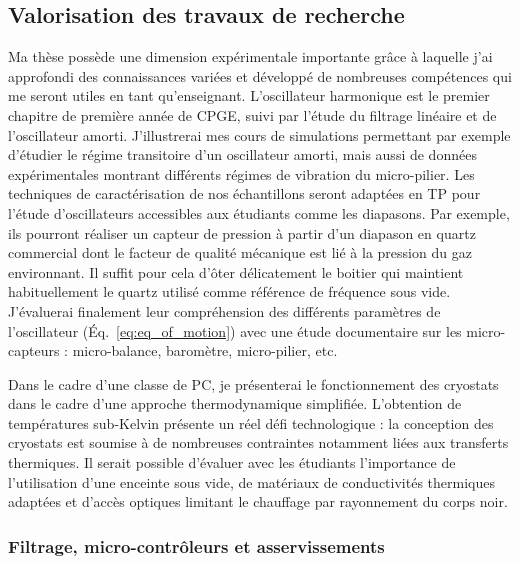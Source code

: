 \documentclass[12pt,a4paper]{article}
\begin{document}
\subsection{Valorisation des travaux de recherche}

Ma thèse possède une dimension expérimentale importante grâce à laquelle j'ai approfondi des connaissances variées et développé de nombreuses compétences qui me seront utiles en tant qu'enseignant.
L'oscillateur harmonique est le premier chapitre de première année de CPGE, suivi par l'étude du filtrage linéaire et de l'oscillateur amorti.
J'illustrerai mes cours de simulations permettant par exemple d'étudier le régime transitoire d'un oscillateur amorti, mais aussi de données expérimentales montrant différents régimes de vibration du micro-pilier.
Les techniques de caractérisation de nos échantillons seront adaptées en TP pour l'étude d'oscillateurs accessibles aux étudiants comme les diapasons.
Par exemple, ils pourront réaliser un capteur de pression à partir d'un diapason en quartz commercial dont le facteur de qualité mécanique est lié à la pression du gaz environnant.
Il suffit pour cela d'ôter délicatement le boitier qui maintient habituellement le quartz utilisé comme référence de fréquence sous vide.
J'évaluerai finalement leur compréhension des différents paramètres de l'oscillateur (\'Eq.~\eqref{eq:eq_of_motion}) avec une étude documentaire sur les micro-capteurs : micro-balance, baromètre, micro-pilier, etc.

Dans le cadre d'une classe de PC, je présenterai le fonctionnement des cryostats dans le cadre d'une approche thermodynamique simplifiée.
L'obtention de températures sub-Kelvin présente un réel défi technologique : la conception des cryostats est soumise à de nombreuses contraintes notamment liées aux transferts thermiques.
Il serait possible d'évaluer avec les étudiants l'importance de l'utilisation d'une enceinte sous vide, de matériaux de conductivités thermiques adaptées et d'accès optiques limitant le chauffage par rayonnement du corps noir.

\subsubsection{Filtrage, micro-contrôleurs et asservissements}
\label{sec:controls}
\end{document}

